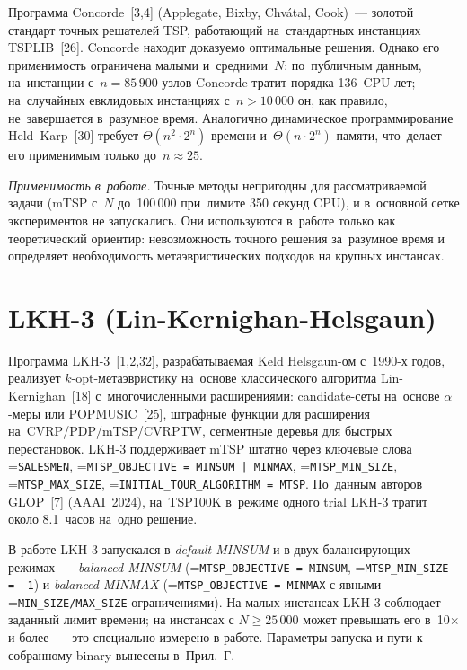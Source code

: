 \documentclass[a4paper,14pt]{extreport}
\makeatletter
\let\old@texttt\texttt
\renewcommand{\texttt}[1]{{\sloppy\hyphenchar\font=\m@ne\old@texttt{#1}}}
\makeatother
\begin{document}
Программа Concorde~[3,4] (Applegate, Bixby, Chvátal, Cook)~--- золотой стандарт точных решателей TSP, работающий на~стандартных инстанциях TSPLIB~[26]. Concorde находит доказуемо оптимальные решения. Однако его применимость ограничена малыми и~средними~$N$: по~публичным данным, на~инстанции с~$n=85\,900$ узлов Concorde тратит порядка 136~CPU-лет; на~случайных евклидовых инстанциях с~$n>10\,000$ он, как правило, не~завершается в~разумное время. Аналогично динамическое программирование Held--Karp~[30] требует $\Theta(n^2\cdot 2^n)$ времени и~$\Theta(n\cdot 2^n)$ памяти, что~делает его применимым только до~$n\approx 25$.

\textit{Применимость в~работе.} Точные методы непригодны для рассматриваемой задачи (mTSP с~$N$ до~100\,000 при~лимите 350 секунд CPU), и в~основной сетке экспериментов не запускались. Они используются в~работе только как теоретический ориентир: невозможность точного решения за~разумное время и определяет необходимость метаэвристических подходов на крупных инстансах.

\section{LKH-3 (Lin-Kernighan-Helsgaun)}

Программа LKH-3~[1,2,32], разрабатываемая Keld Helsgaun-ом с~1990-х годов, реализует $k$-opt-метаэвристику на~основе классического алгоритма Lin-Kernighan~[18] с~многочисленными расширениями: candidate-сеты на~основе $\alpha$-меры или POPMUSIC~[25], штрафные функции для расширения на~CVRP/PDP/mTSP/CVRPTW, сегментные деревья для быстрых перестановок. LKH-3 поддерживает mTSP штатно через ключевые слова \texttt{SALESMEN}, \texttt{MTSP\_OBJECTIVE = MINSUM | MINMAX}, \texttt{MTSP\_MIN\_SIZE}, \texttt{MTSP\_MAX\_SIZE}, \texttt{INITIAL\_TOUR\_ALGORITHM = MTSP}. По~данным авторов GLOP~[7] (AAAI~2024), на~TSP100K в~режиме одного trial LKH-3 тратит около 8.1~часов на~одно решение.

В работе LKH-3 запускался в \emph{default-MINSUM} и в двух балансирующих режимах~--- \emph{balanced-MINSUM} (\texttt{MTSP\_OBJECTIVE = MINSUM}, \texttt{MTSP\_MIN\_SIZE = -1}) и \emph{balanced-MINMAX} (\texttt{MTSP\_OBJECTIVE = MINMAX} с явными \texttt{MIN\_SIZE/MAX\_SIZE}-ограничениями). На малых инстансах LKH-3 соблюдает заданный лимит времени; на инстансах с $N\geq 25\,000$ может превышать его в~10$\times$ и более~--- это специально измерено в работе. Параметры запуска и пути к собранному binary вынесены в~Прил.~Г.
\end{document}
